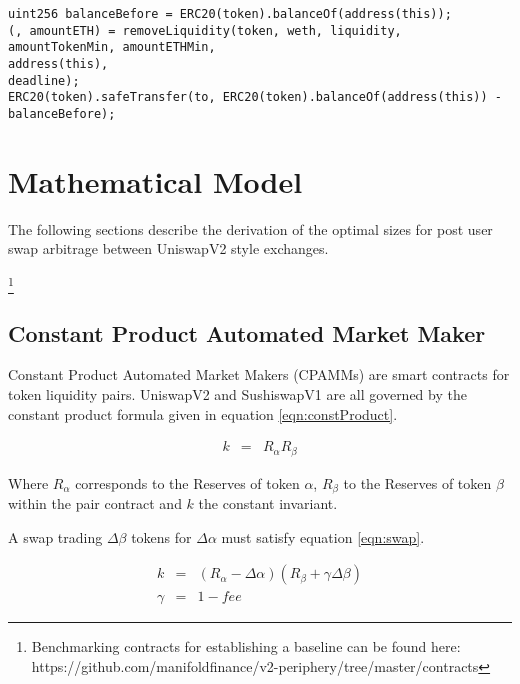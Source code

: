 \documentclass[runningheads]{llncs}
\begin{document}
\begin{verbatim}
uint256 balanceBefore = ERC20(token).balanceOf(address(this));
(, amountETH) = removeLiquidity(token, weth, liquidity, amountTokenMin, amountETHMin, 
address(this), 
deadline);
ERC20(token).safeTransfer(to, ERC20(token).balanceOf(address(this)) - balanceBefore);
\end{verbatim}

\newpage

\chapter{Mathematical Model}




The following sections describe the derivation of the optimal sizes for post user swap arbitrage between UniswapV2 style exchanges.

\footnote{Benchmarking contracts for establishing a baseline can be found here: https://github.com/manifoldfinance/v2-periphery/tree/master/contracts }




\section{Constant Product Automated Market Maker}
Constant Product Automated Market Makers (CPAMMs) are smart contracts for token liquidity pairs. UniswapV2 and SushiswapV1 are all governed by the constant product formula given in equation \ref{eqn:constProduct}.

\begin{eqnarray}
	k  &=& R_{\alpha}  R_{\beta}  \label{eqn:constProduct}
\end{eqnarray}

Where \(R_{\alpha}\) corresponds to the Reserves of token \(\alpha\), \(R_{\beta}\) to the Reserves of token \(\beta\) within the pair contract and \( k \) the constant invariant.

A swap trading \( \Delta\beta\) tokens for \( \Delta\alpha \) must satisfy equation \ref{eqn:swap}.

\begin{eqnarray}
	k  &=& (R_{\alpha} - \Delta\alpha)  (R_{\beta} + \gamma\Delta\beta ) \label{eqn:swap}\\
	\gamma  &=& 1 - fee \label{eqn:gamma}
\end{eqnarray}
\end{document}
